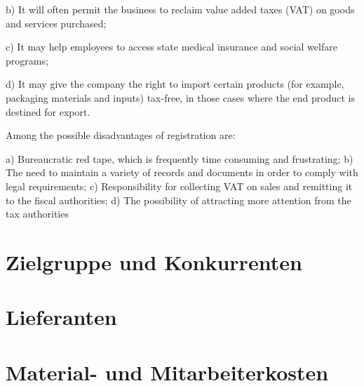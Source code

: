 b) It will often permit the business to reclaim value added taxes (VAT) on goods and services purchased;

c) It may help employees to access state medical insurance and social welfare programs;

d) It may give the company the right to import certain products (for example, packaging materials and inputs) tax-free, in those cases where the end product is destined for export.

Among the possible disadvantages of registration are:

a) Bureaucratic red tape, which is frequently time consuming and frustrating;
b) The need to maintain a variety of records and documents in order to comply with legal requirements;
c) Responsibility for collecting VAT on sales and remitting it to the fiscal authorities;
d) The possibility of attracting more attention from the tax authorities

\section{Zielgruppe und Konkurrenten}

\section{Lieferanten}

\section{Material- und Mitarbeiterkosten}
